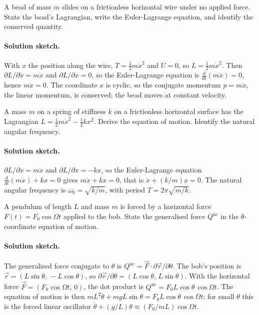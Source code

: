\begin{exercise}
A bead of mass $m$ slides on a frictionless horizontal wire under no
applied force. State the bead's Lagrangian, write the Euler-Lagrange
equation, and identify the conserved quantity.

\paragraph{Solution sketch.} With $x$ the position along the wire,
$T = \tfrac12 m \dot{x}^2$ and $U = 0$, so $L = \tfrac12 m \dot{x}^2$.
Then $\partial L/\partial\dot{x} = m\dot{x}$ and $\partial L/\partial x
= 0$, so the Euler-Lagrange equation is $\tfrac{d}{dt}(m\dot{x}) = 0$,
hence $m\ddot{x} = 0$. The coordinate $x$ is cyclic, so the conjugate
momentum $p = m\dot{x}$, the linear momentum, is conserved; the bead
moves at constant velocity.
\end{exercise}

\begin{exercise}
A mass $m$ on a spring of stiffness $k$ on a frictionless horizontal
surface has the Lagrangian $L = \tfrac{1}{2} m \dot{x}^2 - \tfrac{1}{2}
k x^2$. Derive the equation of motion. Identify the natural angular
frequency.

\paragraph{Solution sketch.} $\partial L/\partial\dot{x} = m\dot{x}$ and
$\partial L/\partial x = -kx$, so the Euler-Lagrange equation
$\tfrac{d}{dt}(m\dot{x}) + kx = 0$ gives $m\ddot{x} + kx = 0$, that is
$\ddot{x} + (k/m)x = 0$. The natural angular frequency is
$\omega_0 = \sqrt{k/m}$, with period $T = 2\pi\sqrt{m/k}$.
\end{exercise}

\begin{exercise}
A pendulum of length $L$ and mass $m$ is forced by a horizontal force
$F(t) = F_0 \cos\Omega t$ applied to the bob. State the generalised
force $Q^{\text{nc}}$ in the $\theta$-coordinate equation of motion.

\paragraph{Solution sketch.} The generalised force conjugate to
$\theta$ is $Q^{\text{nc}} = \vec{F}\cdot\partial\vec{r}/\partial\theta$.
The bob's position is $\vec{r} = (L\sin\theta,\,-L\cos\theta)$, so
$\partial\vec{r}/\partial\theta = (L\cos\theta,\,L\sin\theta)$. With the
horizontal force $\vec{F} = (F_0\cos\Omega t,\,0)$, the dot product is
$Q^{\text{nc}} = F_0 L \cos\theta\,\cos\Omega t$. The equation of motion
is then $mL^2\ddot{\theta} + mgL\sin\theta = F_0 L\cos\theta\,\cos\Omega
t$; for small $\theta$ this is the forced linear oscillator
$\ddot{\theta} + (g/L)\theta \approx (F_0/mL)\cos\Omega t$.
\end{exercise}

